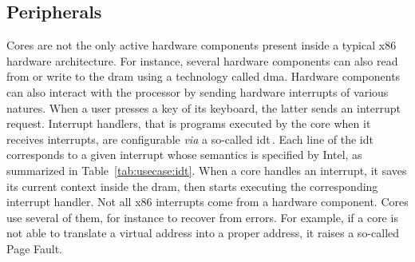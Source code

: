\subsection{Peripherals \IOs}
\label{subsec:usecase:periphio}

Cores are not the only active hardware components present inside a typical x86
hardware architecture.
%
For instance, several hardware components can also read from or write to the
\ac{dram} using a technology called \ac{dma}.
%
Hardware components can also interact with the processor by sending hardware
interrupts of various natures.
%
When a user presses a key of its keyboard, the latter sends an interrupt
request.
%
Interrupt handlers, that is programs executed by the core when it receives
interrupts, are configurable \emph{via} a so-called \ac{idt}\,\cite[Volume 3,
Chapter 6]{intel2014manual}.
%
Each line of the \ac{idt} corresponds to a given interrupt whose semantics is
specified by Intel, as summarized in Table~\ref{tab:usecase:idt}.
%
When a core handles an interrupt, it saves its current context inside the
\ac{dram}, then starts executing the corresponding interrupt handler.
%
Not all x86 interrupts come from a hardware component.
%
Cores use several of them, for instance to recover from errors.
%
For example, if a core is not able to translate a virtual address into a proper
address, it raises a so-called Page Fault.

